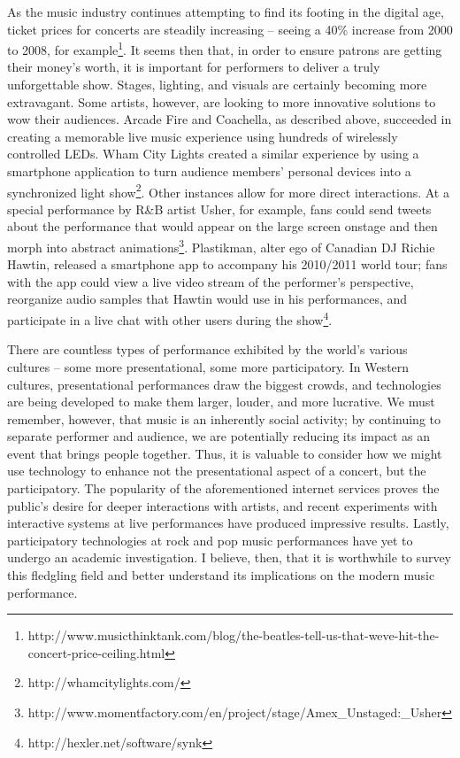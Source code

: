 As the music industry continues attempting to find its footing in the digital age, ticket prices for concerts are steadily increasing -- seeing a 40\% increase from 2000 to 2008, for example\footnote{http://www.musicthinktank.com/blog/the-beatles-tell-us-that-weve-hit-the-concert-price-ceiling.html}. It seems then that, in order to ensure patrons are getting their money's worth, it is important for performers to deliver a truly unforgettable show. Stages, lighting, and visuals are certainly becoming more extravagant. Some artists, however, are looking to more innovative solutions to wow their audiences. Arcade Fire and Coachella, as described above, succeeded in creating a memorable live music experience using hundreds of wirelessly controlled LEDs. Wham City Lights created a similar experience by using a smartphone application to turn audience members' personal devices into a synchronized light show\footnote{http://whamcitylights.com/}. Other instances allow for more direct interactions. At a special performance by R\&B artist Usher, for example, fans could send tweets about the performance that would appear on the large screen onstage and then morph into abstract animations\footnote{http://www.momentfactory.com/en/project/stage/Amex\_Unstaged:\_Usher}. Plastikman, alter ego of Canadian DJ Richie Hawtin, released a smartphone app to accompany his 2010/2011 world tour; fans with the app could view a live video stream of the performer's perspective, reorganize audio samples that Hawtin would use in his performances, and participate in a live chat with other users during the show\footnote{http://hexler.net/software/synk}.

There are countless types of performance exhibited by the world's various cultures -- some more presentational, some more participatory. In Western cultures, presentational performances draw the biggest crowds, and technologies are being developed to make them larger, louder, and more lucrative. We must remember, however, that music is an inherently social activity; by continuing to separate performer and audience, we are potentially reducing its impact as an event that brings people together. Thus, it is valuable to consider how we might use technology to enhance not the presentational aspect of a concert, but the participatory. The popularity of the aforementioned internet services proves the public's desire for deeper interactions with artists, and recent experiments with interactive systems at live performances have produced impressive results. Lastly, participatory technologies at rock and pop music performances have yet to undergo an academic investigation. I believe, then, that it is worthwhile to survey this fledgling field and better understand its implications on the modern music performance.\\

